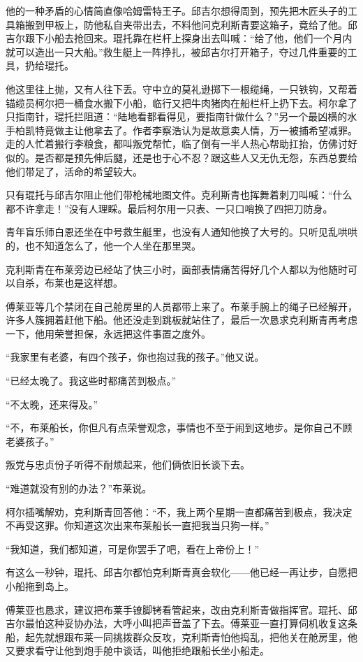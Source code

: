 \par 他的一种矛盾的心情简直像哈姆雷特王子。邱吉尔想得周到，预先把木匠头子的工具箱搬到甲板上，防他私自夹带出去，不料他问克利斯青要这箱子，竟给了他。邱吉尔跟下小船去抢回来。琨托靠在栏杆上探身出去叫喊：“给了他，他们一个月内就可以造出一只大船。”救生艇上一阵挣扎，被邱吉尔打开箱子，夺过几件重要的工具，扔给琨托。
\par 他这里往上抛，又有人往下丢。守中立的莫礼逊掷下一根缆绳，一只铁钩，又帮着锚缆员柯尔把一桶食水搬下小船，临行又把牛肉猪肉在船栏杆上扔下去。柯尔拿了只指南针，琨托拦阻道：“陆地看都看得见，要指南针做什么？”另一个最凶横的水手柏凯特竟做主让他拿去了。作者李察浩认为是故意卖人情，万一被捕希望减罪。走的人忙着搬行李粮食，都叫叛党帮忙，临了倒有一半人热心帮助扛抬，仿佛讨好似的。是否都是预先伸后腿，还是也于心不忍？跟这些人又无仇无怨，东西总要给他们带足了，活命的希望较大。
\par 只有琨托与邱吉尔阻止他们带枪械地图文件。克利斯青也挥舞着刺刀叫喊：“什么都不许拿走！”没有人理睬。最后柯尔用一只表、一只口哨换了四把刀防身。
\par 青年盲乐师白恩还坐在中号救生艇里，也没有人通知他换了大号的。只听见乱哄哄的，也不知道怎么了，他一个人坐在那里哭。
\par 克利斯青在布莱旁边已经站了快三小时，面部表情痛苦得好几个人都以为他随时可以自杀，布莱也是这样想。
\par 傅莱亚等几个禁闭在自己舱房里的人员都带上来了。布莱手腕上的绳子已经解开，许多人簇拥着赶他下船。他还没走到跳板就站住了，最后一次恳求克利斯青再考虑一下，他用荣誉担保，永远把这件事置之度外。
\par “我家里有老婆，有四个孩子，你也抱过我的孩子。”他又说。
\par “已经太晚了。我这些时都痛苦到极点。”
\par “不太晚，还来得及。”
\par “不，布莱船长，你但凡有点荣誉观念，事情也不至于闹到这地步。是你自己不顾老婆孩子。”
\par 叛党与忠贞份子听得不耐烦起来，他们俩依旧长谈下去。
\par “难道就没有别的办法？”布莱说。
\par 柯尔插嘴解劝，克利斯青回答他：“不，我上两个星期一直都痛苦到极点，我决定不再受这罪。你知道这次出来布莱船长一直把我当只狗一样。”
\par “我知道，我们都知道，可是你罢手了吧，看在上帝份上！”
\par 有这么一秒钟，琨托、邱吉尔都怕克利斯青真会软化——他已经一再让步，自愿把小船拖到岛上。
\par 傅莱亚也恳求，建议把布莱手镣脚铐看管起来，改由克利斯青做指挥官。琨托、邱吉尔最怕这种妥协办法，大呼小叫把声音盖了下去。傅莱亚一直打算伺机收复这条船，起先就想跟布莱一同挑拨群众反攻，克利斯青怕他捣乱，把他关在舱房里，他又要求看守让他到炮手舱中谈话，叫他拒绝跟船长坐小船走。
